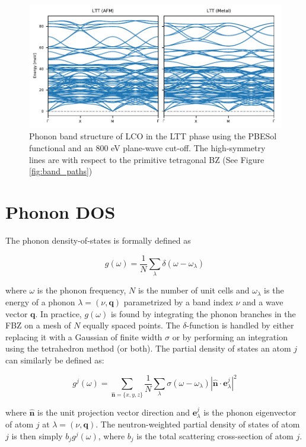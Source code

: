 \begin{figure}
	\centering
	\includegraphics[width=\textwidth]{fig/simulation/ltt_bands.pdf}
	\caption[LTT Bands]{Phonon band structure of LCO in the LTT phase using the PBESol functional and an 800 eV plane-wave cut-off. The high-symmetry lines are with respect to the primitive tetragonal BZ (See Figure \ref{fig:band_paths})}
	\label{fig:ltt_bands}
\end{figure}

\section{Phonon DOS}
The phonon density-of-states is formally defined as

\[ g(\omega) = \frac{1}{N} \sum_\lambda \delta(\omega - \omega _\lambda) \]

\noindent where $\omega$ is the phonon frequency, $N$ is the number of unit cells and $\omega _\lambda$ is the energy of a phonon $\lambda=(\nu,\bm{q})$ parametrized by a band index $\nu$ and a wave vector $\bm{q}$. In practice, $g(\omega)$ is found by integrating the phonon branches in the FBZ on a mesh of $N$ equally spaced points. The $\delta$-function is handled by either replacing it with a Gaussian of finite width $\sigma$ or by performing an integration using the tetrahedron method \cite{Blochl1994} (or both). The partial density of states an atom $j$ can similarly be defined as:

\[ g^j (\omega) = \sum_{\bm{\hat{n}}=\{x,y,z\}} \frac{1}{N} \sum_\lambda \sigma(\omega - \omega_\lambda) \left| \bm{\hat{n}} \cdot \bm{e}^j_\lambda \right| ^2 \]

\noindent where $\bm{\hat{n}}$ is the unit projection vector direction and $\bm{e}^j_\lambda$ is the phonon eigenvector of atom $j$ at $\lambda=(\nu,\bm{q})$. The neutron-weighted partial density of states of atom $j$ is then simply $b_j g^j(\omega)$, where $b_j$ is the total scattering cross-section of atom $j$.

